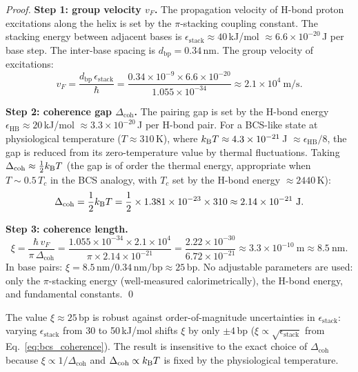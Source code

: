 \begin{proof}
\textbf{Step 1: group velocity $v_F$.}
The propagation velocity of H-bond proton excitations along the helix is
set by the $\pi$-stacking coupling constant. The stacking energy between
adjacent bases is $\epsilon_{\mathrm{stack}} \approx 40$\,kJ/mol
$\approx 6.6 \times 10^{-20}$\,J per base step. The inter-base spacing
is $d_{\mathrm{bp}} = 0.34$\,nm. The group velocity of excitations:
\begin{equation}
  v_F = \frac{d_{\mathrm{bp}}\,\epsilon_{\mathrm{stack}}}{\hbar}
    = \frac{0.34 \times 10^{-9} \times 6.6 \times 10^{-20}}{1.055 \times 10^{-34}}
    \approx 2.1 \times 10^4\ \mathrm{m/s}.
  \label{eq:vf}
\end{equation}

\textbf{Step 2: coherence gap $\Delta_{\mathrm{coh}}$.}
The pairing gap is set by the H-bond energy
$\epsilon_{\mathrm{HB}} \approx 20$\,kJ/mol $\approx 3.3 \times 10^{-20}$\,J
per H-bond pair. For a BCS-like state at physiological temperature
($T \approx 310$\,K), where $k_{\mathrm{B}} T \approx 4.3 \times 10^{-21}$\,J
$\approx \epsilon_{\mathrm{HB}}/8$, the gap is reduced from its zero-temperature
value by thermal fluctuations. Taking $\Delta_{\mathrm{coh}} \approx \frac{1}{2}k_{\mathrm{B}} T$
(the gap is of order the thermal energy, appropriate when
$T \sim 0.5\,T_c$ in the BCS analogy, with $T_c$ set by the H-bond energy
$\approx 2440$\,K):
\begin{equation}
  \Delta_{\mathrm{coh}} = \frac{1}{2}k_{\mathrm{B}} T
    = \frac{1}{2} \times 1.381 \times 10^{-23} \times 310
    \approx 2.14 \times 10^{-21}\ \mathrm{J}.
  \label{eq:delta_coh}
\end{equation}

\textbf{Step 3: coherence length.}
\begin{equation}
  \xi = \frac{\hbar\,v_F}{\pi\,\Delta_{\mathrm{coh}}}
    = \frac{1.055 \times 10^{-34} \times 2.1 \times 10^4}
           {\pi \times 2.14 \times 10^{-21}}
    = \frac{2.22 \times 10^{-30}}{6.72 \times 10^{-21}}
    \approx 3.3 \times 10^{-10}\ \mathrm{m}
    \approx 8.5\ \mathrm{nm}.
  \label{eq:xi_calculation}
\end{equation}
In base pairs: $\xi = 8.5\,\mathrm{nm} / 0.34\,\mathrm{nm/bp} \approx 25$\,bp.
No adjustable parameters are used: only the $\pi$-stacking energy
(well-measured calorimetrically), the H-bond energy, and fundamental constants.
\qed
\end{proof}

\begin{remark}
The value $\xi \approx 25$\,bp is robust against order-of-magnitude
uncertainties in $\epsilon_{\mathrm{stack}}$: varying $\epsilon_{\mathrm{stack}}$
from 30 to 50\,kJ/mol shifts $\xi$ by only $\pm 4$\,bp ($\xi \propto \sqrt{\epsilon_{\mathrm{stack}}}$
from Eq.~\eqref{eq:bcs_coherence}). The result is insensitive to the exact
choice of $\Delta_{\mathrm{coh}}$ because $\xi \propto 1/\Delta_{\mathrm{coh}}$
and $\Delta_{\mathrm{coh}} \propto k_{\mathrm{B}} T$ is fixed by the physiological
temperature.
\end{remark}

